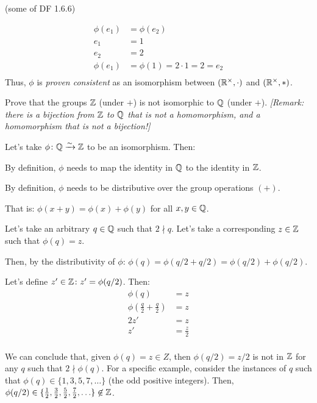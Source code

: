 \begin{problem}{\textsf{(some of DF 1.6.6)}}
\begin{enumalph}
\begin{Answer}
      \begin{align*}
        \phi(e_1) &= \phi(e_2) \\
        e_1 &= 1 \\
        e_2 &= 2 \\
        \phi(e_1) &= \phi(1) = 2 \cdot 1 = 2 = e_2  \\
      \end{align*}
      Thus, $\phi$ is \textit{proven consistent} as an isomorphism between
      $(\mathbb{R}^\times,\cdot)$ and $(\mathbb{R}^\times,*)$.
    \end{Answer}
    \newpage
    \item Prove that the groups $\mathbb{Z}$ (under $+$) is not isomorphic to $\mathbb{Q}$ (under $+$).
    \emph{[Remark: there is a bijection from $\mathbb{Z}$ to $\mathbb{Q}$ that is not a homomorphism, 
    and a homomorphism that is not a bijection!]}

    \begin{Answer}

      Let's take $\phi \colon \mathbb{Q} \xrightarrow{\sim} \mathbb{Z}$ to be an isomorphism. Then:
      \begin{enumroman}
        \item By definition, $\phi$ needs to map the identity in $\mathbb{Q}$ to the identity in $\mathbb{Z}$.
        \item By definition, $\phi$ needs to be distributive over the group operations $(+)$.
        
        \noindent
        That is: $\phi(x+y) = \phi(x) + \phi(y)$ for all $x,y \in \mathbb{Q}$.
        
      \end{enumroman}

      \noindent
      Let's take an arbitrary $q \in \mathbb{Q}$ such that $2 \nmid q$.
      Let's take a corresponding $z \in \mathbb{Z}$ such that $\phi(q) = z$.
      
      \noindent
      Then, by the distributivity of $\phi$: $\phi(q) = \phi(q/2 + q/2) = \phi(q/2) + \phi(q/2)$.

      \noindent
      Let's define $z' \in \mathbb{Z} \colon z' = \phi(q/2)$. Then:
      \begin{align*}
        \phi(q) &= z \\
        \phi(\frac{q}{2} + \frac{q}{2}) &= z \\
        2z' &= z \\
        z' &= \frac{z}{2} \\
      \end{align*}

      \noindent
      We can conclude that, given $\phi(q) = z \in Z$,
      then $\phi(q/2) = z/2$ is not in $\mathbb{Z}$
      for any $q$ such that $2 \nmid \phi(q)$.
      For a specific example, consider the instances of $q$ such that
      $\phi(q) \in \{1, 3, 5, 7, \ldots\}$ (the odd positive integers).
      Then, $\phi(q/2) \in \{\frac{1}{2}, \frac{3}{2}, \frac{5}{2}, \frac{7}{2}, \ldots\} \not\in \mathbb{Z}$.


\end{Answer}
\end{enumalph}
\end{problem}
